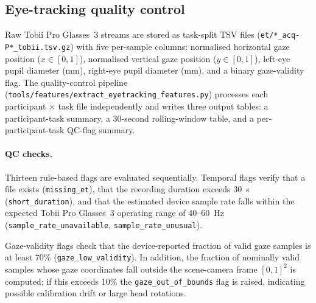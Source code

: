 
\subsection{Eye-tracking quality control}
\label{sec:et_qc}

Raw Tobii Pro Glasses~3 streams are stored as task-split TSV files
(\texttt{et/*\_acq-P*\_tobii.tsv.gz}) with five per-sample columns:
normalised horizontal gaze position ($x \in [0,1]$),
normalised vertical gaze position ($y \in [0,1]$),
left-eye pupil diameter (mm),
right-eye pupil diameter (mm),
and a binary gaze-validity flag.
The quality-control pipeline
(\texttt{tools/features/extract\_eyetracking\_features.py})
processes each participant $\times$ task file independently and writes three
output tables: a participant-task summary, a 30-second rolling-window table,
and a per-participant-task QC-flag summary.

\paragraph{QC checks.}
Thirteen rule-based flags are evaluated sequentially.
Temporal flags verify that a file exists (\texttt{missing\_et}),
that the recording duration exceeds 30~s (\texttt{short\_duration}),
and that the estimated device sample rate falls within the expected
Tobii Pro Glasses~3 operating range of 40--60~Hz
(\texttt{sample\_rate\_unavailable}, \texttt{sample\_rate\_unusual}).

Gaze-validity flags check that the device-reported fraction of valid gaze
samples is at least 70\% (\texttt{gaze\_low\_validity}).
In addition, the fraction of nominally valid samples whose gaze coordinates
fall outside the scene-camera frame $[0,1]^2$ is computed;
if this exceeds 10\% the \texttt{gaze\_out\_of\_bounds} flag is raised,
indicating possible calibration drift or large head rotations.

